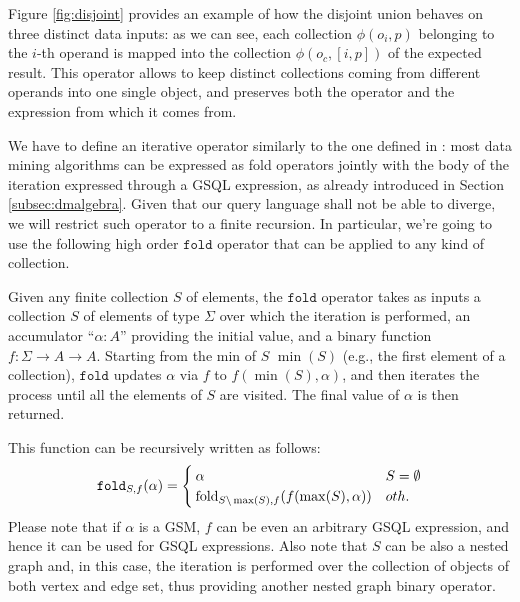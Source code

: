 \begin{example}
	Figure \vref{fig:disjoint} provides an example of how the disjoint union behaves on three distinct data inputs: as we can see, each collection $\phi(o_i,p)$ belonging to the $i$-th operand is mapped into the collection $\phi(o_c,[i,p])$ of the expected result. This operator allows to keep distinct collections coming from different operands into one single object, and preserves both the operator and the expression from which it comes from.
\end{example}

 We have to define an iterative operator similarly to the one defined in \cite{Calders2006,apacheflink}:  most data mining algorithms can be expressed as fold operators jointly with the body of the iteration expressed through a GSQL expression, as already introduced in Section \vref{subsec:dmalgebra}. Given that our query language shall not be able to diverge, we will restrict such operator to a finite recursion. In particular, we're going to use the following  high order $\texttt{fold}$ operator that can be applied to any kind of collection.

\begin{definition}\label{def:fold}
	Given any finite collection $S$ of elements, the $\texttt{fold}$ operator takes as inputs a collection $S$ of elements of type $\Sigma$ over which the iteration is performed, an accumulator ``$\alpha \colon A$'' providing the initial value, and a binary function $f:\Sigma\to A\to A$. Starting from the min of $S$ $\min(S)$ (e.g., the first element of a collection), $\texttt{fold}$ updates $\alpha$ via $f$  to $f(\min(S),\alpha)$, and then iterates the process until all the elements of $S$ are visited. The final value of $\alpha$ is then returned.

	This function can be recursively written as follows:
	\[\texttt{fold}_{S,f}(\alpha)=\begin{cases}
	\alpha & S=\emptyset\\
	\textup{fold}_{S\backslash\max(S),f}(f(\max(S),\alpha)) & oth.
	\end{cases}\]
	Please note that if $\alpha$ is a GSM, $f$ can be even an arbitrary GSQL expression, and hence it can be used for GSQL expressions. Also note that $S$ can be also a nested graph and, in this case, the iteration is performed over the collection of objects of both vertex and edge set, thus providing another nested graph binary operator.
\end{definition}

